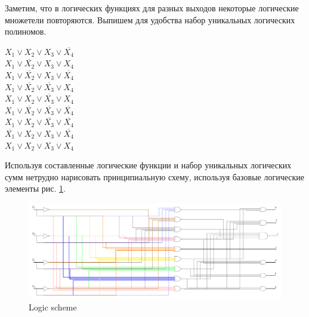 \documentclass[a4paper, 12pt]{article}
\newcommand{\Or}{\vee}
\newcommand{\Not}{\overline}
\begin{document}
Заметим, что в логических функциях для разных выходов некоторые логические множетели повторяются. Выпишем для удобства набор уникальных логических полиномов.

\begin{center}
    $X_1 \Or X_2 \Or X_3 \Or \Not{X_4}$ \\
    $X_1 \Or \Not{X_2} \Or X_3 \Or X_4$ \\
    $X_1 \Or \Not{X_2} \Or X_3 \Or \Not{X_4}$ \\
    $X_1 \Or \Not{X_2} \Or \Not{X_3} \Or X_4$ \\
    $X_1 \Or X_2 \Or \Not{X_3} \Or X_4$ \\
    $X_1 \Or \Not{X_2} \Or \Not{X_3} \Or \Not{X_4}$ \\
    $X_1 \Or X_2 \Or \Not{X_3} \Or \Not{X_4}$ \\
    $\Not{X_1} \Or X_2 \Or X_3 \Or \Not{X_4}$ \\
    $X_1 \Or X_2 \Or X_3 \Or X_4$ \\
\end{center}

Используя составленные логические функции и набор уникальных логических сумм нетрудно нарисовать принципиальную схему, используя базовые логические элементы рис. \ref{fig:Logic_scheme}.

\begin{landscape}
    \begin{figure}
        \centering
        \includegraphics[scale=0.69]{images/test_logic_schems.pdf}
        \caption{Logic scheme}
        \label{fig:Logic_scheme}
    \end{figure}
\end{landscape}
\end{document}
